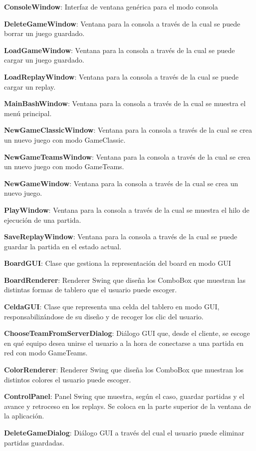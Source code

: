 \documentclass[../DocumentoOficial.tex]{subfiles}
\begin{document}
\textbf{ConsoleWindow}: Interfaz de ventana genérica para el modo consola

\textbf{DeleteGameWindow}: Ventana para la consola a través de la cual se puede borrar un juego guardado.

\textbf{LoadGameWindow}: Ventana para la consola a través de la cual se puede cargar un juego guardado.

\textbf{LoadReplayWindow}: Ventana para la consola a través de la cual se puede cargar un replay.

\textbf{MainBashWindow}: Ventana para la consola a través de la cual se muestra el menú principal.

\textbf{NewGameClassicWindow}: Ventana para la consola a través de la cual se crea un nuevo juego con modo GameClassic.

\textbf{NewGameTeamsWindow}: Ventana para la consola a través de la cual se crea un nuevo juego con modo GameTeams.

\textbf{NewGameWindow}: Ventana para la consola a través de la cual se crea un nuevo juego.

\textbf{PlayWindow}: Ventana para la consola a través de la cual se muestra el hilo de ejecución de una partida.

\textbf{SaveReplayWindow}: Ventana para la consola a través de la cual se puede guardar la partida en el estado actual.

\textbf{BoardGUI}: Clase que gestiona la representación del board en modo GUI

\textbf{BoardRenderer}: Renderer Swing que diseña los ComboBox que muestran las distintas formas de tablero que el usuario puede escoger.

\textbf{CeldaGUI}: Clase que representa una celda del tablero en modo GUI, responsabilizándose de su diseño y de recoger los clic del usuario.

\textbf{ChooseTeamFromServerDialog}: Diálogo GUI que, desde el cliente, se escoge en qué equipo desea unirse el usuario a la hora de conectarse a una partida en red con modo GameTeams.

\textbf{ColorRenderer}: Renderer Swing que diseña los ComboBox que muestran los distintos colores el usuario puede escoger.

\textbf{ControlPanel}: Panel Swing que muestra, según el caso, guardar partidas y el avance y retroceso en los replays. Se coloca en la parte superior de la ventana de la aplicación.

\textbf{DeleteGameDialog}: Diálogo GUI a través del cual el usuario puede eliminar partidas guardadas.
\end{document}

